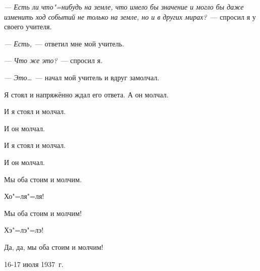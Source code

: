 \textit{--- Есть ли что"=нибудь на земле, что имело бы значение и могло бы даже 
изменить ход событий не только на земле, но и в других мирах?}~--- спросил я у 
своего учителя.

\textit{--- Есть,}~--- ответил мне мой учитель.

\textit{--- Что же это?}~--- спросил я.

\textit{--- Это\dots}~--- начал мой учитель и вдруг замолчал.

Я стоял и напряжённо ждал его ответа. А он молчал.

И я стоял и молчал.

И он молчал.

И я стоял и молчал.

И он молчал.

Мы оба стоим и молчим.

Хо"=ля"=ля!

Мы оба стоим и молчим!

Хэ"=лэ"=лэ!

Да, да, мы оба стоим и молчим!

\begin{flushright}
16-17 июля 1937~г.
\end{flushright}


